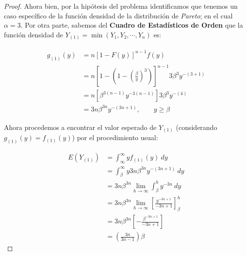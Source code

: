 \begin{enumerate}
\begin{proof}
    Ahora bien, por la hipótesis del problema identificamos que tenemos un caso específico de la función densidad de la distribución de \textit{Pareto}; en el cual $\alpha = 3$. Por otra parte, sabemos del \textbf{Cuadro de Estadísticos de Orden} que la función densidad de $Y_{(1)}=\min(Y_1,Y_2,\cdots, Y_n)$ es:
    
    \begin{align}
    \begin{split}
        g_{(1)}(y)&=n\left[1-F(y)\right]^{n-1}f(y) \\ 
                  &=n\left[1-\left( 1-\left(\frac{\beta}{y}\right)^3 \right)\right]^{n-1} 3 \beta ^3 y^{-(3+1)}\\
                  &= n\left[\beta^{3(n-1)}y^{-3(n-1)}\right]3 \beta ^3 y^{-(4)}\\
                  &= 3n\beta^{3n}y^{-(3n+1)}, \qquad y\geq \beta 
    \end{split}
    \end{align} 
    
    \linea 
    
    Ahora procedemos a encontrar el valor esperado de $Y_{(1)}$ (considerando $g_{(1)}(y)=f_{(1)}(y)$) por el procedimiento usual:
    
    \begin{align*}
        E(Y_{(1)}) &= \int_{\infty}^{\infty} y f_{(1)}(y) \ d y\\
                   &= \int_{\beta}^{\infty} y 3n\beta^{3n}y^{-(3n+1)} \ dy\\
                   &= 3n\beta^{3n}\lim_{h\to \infty}\int_{\beta}^{h} y^{-3n} \ dy\\
                   &= 3n\beta^{3n}\lim_{h\to \infty}\left[\frac{y^{-3n+1}}{-3n+1}\right]_\beta^h\\
                   &= 3n\beta^{3n}\left[-\frac{\beta^{-3n+1}}{-3n+1}\right]\\
                   &= \left(\frac{3n}{3n-1}\right)\beta
    \end{align*}
    
    \linea 
    

\end{proof}
\end{enumerate}

